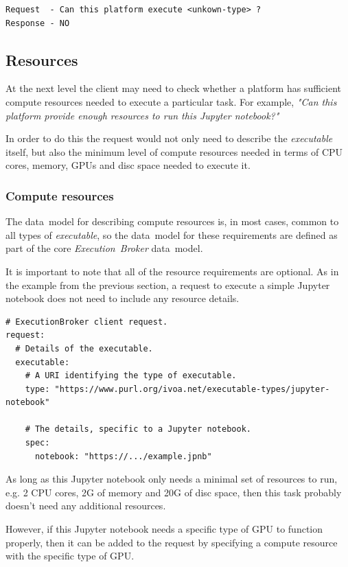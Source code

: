 \documentclass[11pt,a4paper]{ivoa}
\newcommand{\datamodel} {data~model}
\newcommand{\executionbroker} {\textit{Execution~Broker}}
\newcommand{\executable} {\textit{executable}}
\newcommand{\jupyternotebook} {Jupyter notebook}
\newcommand{\cpu}[1] {CPU#1}
\newcommand{\gpu}[1] {GPU#1}
\begin{document}
\begin{lstlisting}[]
Request  - Can this platform execute <unkown-type> ?
Response - NO
\end{lstlisting}

\subsection{Resources}
\label{resources}

At the next level the client may need to check whether a platform has sufficient compute resources
needed to execute a particular task.
For example, \textit{"Can this platform provide enough resources to run this \jupyternotebook{}?"}

In order to do this the request would not only need to describe the \executable{} itself,
but also the minimum level of compute resources needed in terms of \cpu{} cores, memory, \gpu{s}
and disc space needed to execute it.

\subsubsection{Compute resources}
\label{compute-resources}

The \datamodel{} for describing compute resources is, in most cases, common to all types of \executable{},
so the \datamodel{} for these requirements are defined as part of the core \executionbroker{} \datamodel{}.

It is important to note that all of the resource requirements are optional.
As in the example from the previous section, a request to execute a simple \jupyternotebook{}
does not need to include any resource details.

\begin{lstlisting}[]
# ExecutionBroker client request.
request:
  # Details of the executable.
  executable:
    # A URI identifying the type of executable.
    type: "https://www.purl.org/ivoa.net/executable-types/jupyter-notebook"

    # The details, specific to a Jupyter notebook.
    spec:
      notebook: "https://.../example.jpnb"
\end{lstlisting}

As long as this \jupyternotebook{} only needs a minimal set of resources to run, e.g.
2 \cpu{} cores, 2G of memory and 20G of disc space, then this task probably doesn't need
any additional resources.

However, if this \jupyternotebook{} needs a specific type of \gpu{} to function properly,
then it can be added to the request by specifying a compute resource with the specific type
of \gpu{}.
\end{document}
